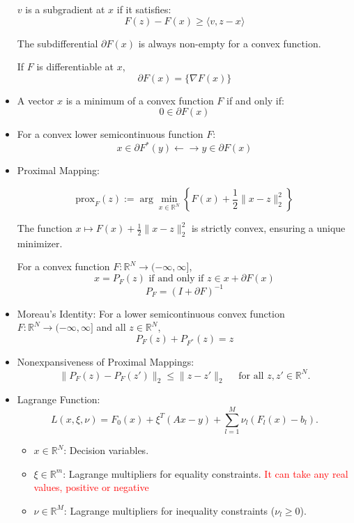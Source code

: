 \documentclass{article}
\begin{document}
\begin{itemize}
    \( v \) is a subgradient at \( x \) if it satisfies:
    \[
    F(z) - F(x) \geq \langle v, z - x \rangle
    \]

     The subdifferential \( \partial F(x) \) is always non-empty for a convex function.

      If \( F \) is differentiable at \( x \),
    \[
    \partial F(x) = \{ \nabla F(x) \}
    \]

\item  A vector $x$ is a minimum of a convex function $F$ if and only if:
    \[
    0 \in \partial F(x)
    \]

 \item For a convex lower semicontinuous function $F$:
        \[
        x \in \partial F^*(y) \leftarrow \rightarrow y \in \partial F(x)
        \]

\item Proximal Mapping:

\[
\text{prox}_F(z) := \arg \min_{x \in \mathbb{R}^N} \left\{ F(x) + \frac{1}{2} \| x - z \|_2^2 \right\}
\]

The function $x \mapsto F(x) + \frac{1}{2} \| x - z \|_2^2$ is strictly convex, ensuring a unique minimizer.

For a convex function $F : \mathbb{R}^N \rightarrow (-\infty,\infty]$,
\[
x = P_F(z) \text{ if and only if } z \in x + \partial F(x)
\]
\[
P_F = (I + \partial F)^{-1}
\]

\item Moreau's Identity:
For a lower semicontinuous convex function $F : \mathbb{R}^N \rightarrow (-\infty,\infty]$ and all $z \in \mathbb{R}^N$,
\[
P_F(z) + P_{F^*}(z) = z
\]

\item Nonexpansiveness of Proximal Mappings:
\[
\|P_F(z) - P_F(z')\|_2 \leq \|z - z'\|_2 \quad \text{ for all } z, z' \in \mathbb{R}^N.
\]

\item Lagrange Function:
\[
L(x, \xi, \nu) = F_0(x) + \xi^T(Ax - y) + \sum_{l=1}^M \nu_l (F_l(x) - b_l).
\]
\begin{itemize}
    \item \(x \in \mathbb{R}^N\): Decision variables.
    \item \(\xi \in \mathbb{R}^m\): Lagrange multipliers for equality constraints. \textcolor{red}{ It can take any real values, positive or negative}
    \item \(\nu \in \mathbb{R}^M\): Lagrange multipliers for inequality constraints (\(\nu_l \geq 0\)).
\end{itemize}


\end{itemize}
\end{document}
